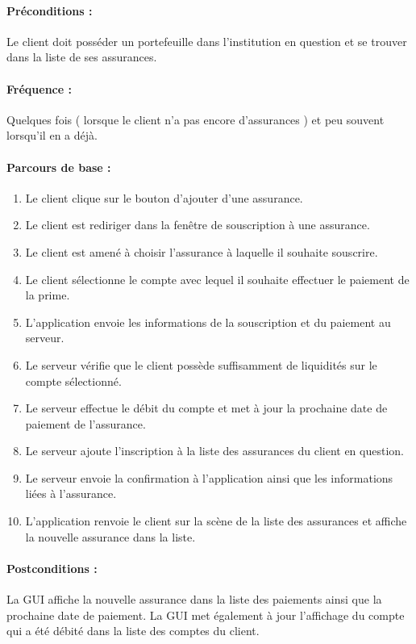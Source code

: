 \documentclass[../annexe.tex]{subfiles}
\begin{document}
\paragraph{Préconditions :}
		Le client doit posséder un portefeuille dans l'institution en question et se trouver dans la liste de ses assurances.
\paragraph{Fréquence :}
		Quelques fois ( lorsque le client n'a pas encore d'assurances ) et peu souvent lorsqu'il en a déjà.
\paragraph{Parcours de base :}
		\begin{enumerate}
				\item Le client clique sur le bouton d'ajouter d'une assurance.
				\item Le client est rediriger dans la fenêtre de souscription à une assurance.
				\item Le client est amené à choisir l'assurance à laquelle il souhaite souscrire. 
				\item Le client sélectionne le compte avec lequel il souhaite effectuer le paiement de la prime.
				\item L'application envoie les informations de la souscription et du paiement au serveur.
				\item Le serveur vérifie que le client possède suffisamment de liquidités sur le compte sélectionné.
				\item Le serveur effectue le débit du compte et met à jour la prochaine date de paiement de l'assurance.
				\item Le serveur ajoute l'inscription à la liste des assurances du client en question.
				\item Le serveur envoie la confirmation à l'application ainsi que les informations liées à l'assurance.
				\item L'application renvoie le client sur la scène de la liste des assurances et affiche la nouvelle assurance dans la liste.
		\end{enumerate}
\paragraph{Postconditions :}
		La GUI affiche la nouvelle assurance dans la liste des paiements ainsi que la prochaine date de paiement. La GUI met également à jour l'affichage du compte qui a
		été débité dans la liste des comptes du client.
\end{document}
